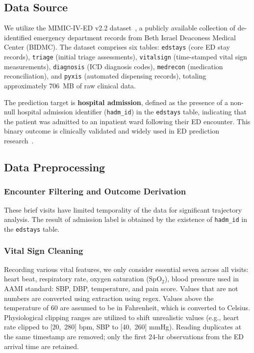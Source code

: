 \documentclass[runningheads]{llncs}
\begin{document}
\subsection{Data Source}

We utilize the MIMIC-IV-ED v2.2 dataset~\cite{Johnson2023}, a publicly available collection of de-identified emergency department records from Beth Israel Deaconess Medical Center (BIDMC). The dataset comprises six tables: \texttt{edstays} (core ED stay records), \texttt{triage} (initial triage assessments), \texttt{vitalsign} (time-stamped vital sign measurements), \texttt{diagnosis} (ICD diagnosis codes), \texttt{medrecon} (medication reconciliation), and \texttt{pyxis} (automated dispensing records), totaling approximately 706~MB of raw clinical data.

The prediction target is \textbf{hospital admission}, defined as the presence of a non-null hospital admission identifier (\texttt{hadm\_id}) in the \texttt{edstays} table, indicating that the patient was admitted to an inpatient ward following their ED encounter. This binary outcome is clinically validated and widely used in ED prediction research~\cite{Xie2022}.

\subsection{Data Preprocessing}

\subsubsection{Encounter Filtering and Outcome Derivation}
These brief visits have limited temporality of the data for significant trajectory analysis. The result of admission label is obtained by the existence of \texttt{hadm\_id} in the \texttt{edstays} table.

\subsubsection{Vital Sign Cleaning}
Recording various vital features, we only consider essential seven across all visits: heart beat, respiratory rate, oxygen saturation (SpO$_2$), blood pressure used in AAMI standard: SBP, DBP, temperature, and pain score. Values that are not numbers are converted using extraction using regex. Values above the temperature of 60 are assumed to be in Fahrenheit, which is converted to Celsius. Physiological clipping ranges are utilized to shift unrealistic values (e.g., heart rate clipped to [20,~280] bpm, SBP to [40,~260] mmHg). Reading duplicates at the same timestamp are removed; only the first 24-hr observations from the ED arrival time are retained.
\end{document}
